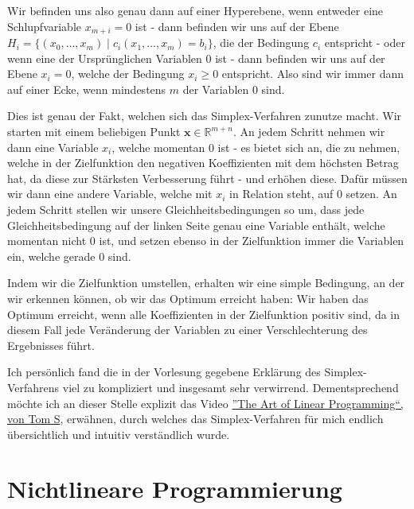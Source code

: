 \documentclass{report}
\newcommand*{\newpar}{\par\vspace{\baselineskip}\noindent}
\begin{document}
\newpar
Wir befinden uns also genau dann auf einer Hyperebene, wenn entweder eine Schlupfvariable $x_{m+i}= 0$ ist - dann befinden wir uns auf der Ebene $H_i = \{(x_0, \hdots, x_m) \mid c_i(x_1, \hdots, x_m) = b_i\}$, die der Bedingung $c_i$ entspricht - oder wenn eine der Ursprünglichen Variablen $0$ ist - dann befinden wir uns auf der Ebene $x_i = 0$, welche der Bedingung $x_i \geq 0$ entspricht. Also sind wir immer dann auf einer Ecke, wenn mindestens $m$ der Variablen $0$ sind.
\newpar
Dies ist genau der Fakt, welchen sich das Simplex-Verfahren zunutze macht. Wir starten mit einem beliebigen Punkt $\bm{x} \in \mathbb{R}^{m+n}$. An jedem Schritt nehmen wir dann eine Variable $x_i$, welche momentan $0$ ist - es bietet sich an, die zu nehmen, welche in der Zielfunktion den negativen Koeffizienten mit dem höchsten Betrag hat, da diese zur Stärksten Verbesserung führt - und erhöhen diese. Dafür müssen wir dann eine andere Variable, welche mit $x_i$ in Relation steht, auf $0$ setzen. An jedem Schritt stellen wir unsere Gleichheitsbedingungen so um, dass jede Gleichheitsbedingung auf der linken Seite genau eine Variable enthält, welche momentan nicht $0$ ist, und setzen ebenso in der Zielfunktion immer die Variablen ein, welche gerade $0$ sind.
\newpar
Indem wir die Zielfunktion umstellen, erhalten wir eine simple Bedingung, an der wir erkennen können, ob wir das Optimum erreicht haben: Wir haben das Optimum erreicht, wenn alle Koeffizienten in der Zielfunktion positiv sind, da in diesem Fall jede Veränderung der Variablen zu einer Verschlechterung des Ergebnisses führt.
\newpar
Ich persönlich fand die in der Vorlesung gegebene Erklärung des Simplex-Verfahrens viel zu kompliziert und insgesamt sehr verwirrend. Dementsprechend möchte ich an dieser Stelle explizit das Video \href{https://www.youtube.com/watch?v=E72DWgKP_1Y}{''The Art of Linear Programming``, von Tom S}, erwähnen, durch welches das Simplex-Verfahren für mich endlich übersichtlich und intuitiv verständlich wurde.
%
%
%
\chapter{Nichtlineare Programmierung}
\end{document}
